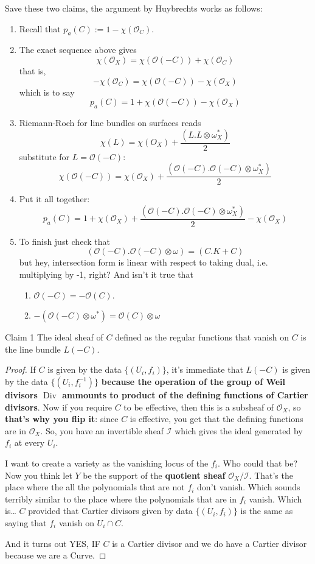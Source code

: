 Save these two claims, the argument by Huybrechts works as follows:
\begin{enumerate}[label=\textbf{Step \arabic*}]
\item Recall that \(p_a(C):=1-\chi(\mathcal{O}_C)\).
\item The exact sequence above gives \[\chi(\mathcal{O}_X)=\chi(\mathcal{O}(-C))+\chi(\mathcal{O}_C)\]
	that is,
	\[-\chi(\mathcal{O}_C)=\chi(\mathcal{O}(-C))-\chi(\mathcal{O}_X)\]
which is to say
\[p_a(C)=1+\chi(\mathcal{O}(-C))-\chi(\mathcal{O}_X)\]
\item Riemann-Roch for line bundles on surfaces reads
	\[\boxed{\chi(L)=\chi(O_X)+\frac{(L.L \otimes \omega_X^*)}{2}}\]
substitute for \(L=\mathcal{O}(-C)\):
\[\chi(\mathcal{O}(-C))=\chi(\mathcal{O}_X)+\frac{(\mathcal{O}(-C).\mathcal{O}(-C)\otimes \omega_X^*)}{2}\]
\item Put it all together:
	\[p_a(C)=1+\chi(\mathcal{O}_X)+\frac{(\mathcal{O}(-C).\mathcal{O}(-C)\otimes \omega_X^*)}{2}-\chi(\mathcal{O}_X)\]
\item To finish just check that
	\[(\mathcal{O}(-C).\mathcal{O}(-C) \otimes \omega)=(C.K+C)\]
but hey, intersection form is linear with respect to taking dual, i.e. multiplying by -1, right? And isn't it true that
\begin{enumerate}
\item \(\mathcal{O}(-C)=-\mathcal{O}(C)\).
\item \(-(\mathcal{O}(-C) \otimes \omega^*)=\mathcal{O}(C) \otimes \omega\)
\end{enumerate}
\end{enumerate}

\begin{thing7}{Claim 1}\leavevmode
The ideal sheaf of  \(C\) defined as the regular functions that vanish on \(C\) is the line bundle  \(L(-C)\).
\end{thing7}
\begin{proof}\leavevmode
If \(C\) is given by the data \(\{(U_i,f_i)\}\), it's immediate that \(L(-C)\) is given by the data  \(\{(U_i,f_i^{-1})\}\) \textbf{because the operation of the group of Weil divisors \(\operatorname{Div}\) ammounts to product of the defining functions of Cartier divisors}. Now if you require \(C\) to be effective, then this is a subsheaf of \(\mathcal{O}_X\), so \textbf{that's why you flip it}: since \(C\) is effective, you get that the defining functions are in \(\mathcal{O}_X\). So, you have an invertible sheaf \(\mathcal{I}\) which gives the ideal generated by \(f_i\) at every \(U_i\).

I want to create a variety as the vanishing locus of the \(f_i\). Who could that be? Now you think let \(Y\) be the support of the \textbf{quotient sheaf} \(\mathcal{O}_X/\mathcal{I}\). That's the place where the all the polynomials that are not \(f_i\) don't vanish. Which sounds terribly similar to the place where the polynomials that are in \(f_i\) vanish. Which is… \(C\) provided that Cartier divisors given by data \(\{(U_i,f_i)\}\) is the same as saying that \(f_i\) vanish on \(U_i \cap C\).

And it turns out YES, IF \(C\) is a Cartier divisor and we do have a Cartier divisor because we are a Curve.
\end{proof}

